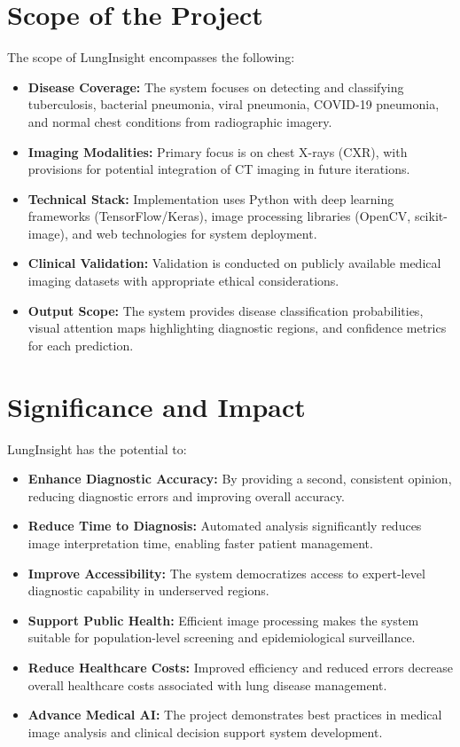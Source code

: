{\section{Scope of the Project}

The scope of LungInsight encompasses the following:

\begin{itemize}
    \item \textbf{Disease Coverage:} The system focuses on detecting and classifying tuberculosis, bacterial pneumonia, viral pneumonia, COVID-19 pneumonia, and normal chest conditions from radiographic imagery.
    \item \textbf{Imaging Modalities:} Primary focus is on chest X-rays (CXR), with provisions for potential integration of CT imaging in future iterations.
    \item \textbf{Technical Stack:} Implementation uses Python with deep learning frameworks (TensorFlow/Keras), image processing libraries (OpenCV, scikit-image), and web technologies for system deployment.
    \item \textbf{Clinical Validation:} Validation is conducted on publicly available medical imaging datasets with appropriate ethical considerations.
    \item \textbf{Output Scope:} The system provides disease classification probabilities, visual attention maps highlighting diagnostic regions, and confidence metrics for each prediction.
\end{itemize}

\section{Significance and Impact}

LungInsight has the potential to:

\begin{itemize}
    \item \textbf{Enhance Diagnostic Accuracy:} By providing a second, consistent opinion, reducing diagnostic errors and improving overall accuracy.
    \item \textbf{Reduce Time to Diagnosis:} Automated analysis significantly reduces image interpretation time, enabling faster patient management.
    \item \textbf{Improve Accessibility:} The system democratizes access to expert-level diagnostic capability in underserved regions.
    \item \textbf{Support Public Health:} Efficient image processing makes the system suitable for population-level screening and epidemiological surveillance.
    \item \textbf{Reduce Healthcare Costs:} Improved efficiency and reduced errors decrease overall healthcare costs associated with lung disease management.
    \item \textbf{Advance Medical AI:} The project demonstrates best practices in medical image analysis and clinical decision support system development.
\end{itemize}

}
